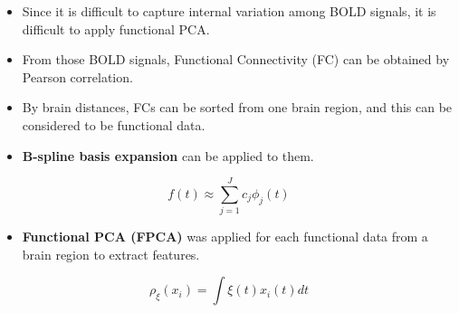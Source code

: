 
    
        \begin{itemize}
            \item Since it is difficult to capture internal variation among BOLD signals, it is difficult to apply functional PCA.

            \item From those BOLD signals, Functional Connectivity (FC) can be obtained by Pearson correlation.
        
            \item By brain distances, FCs can be sorted from one brain region, and this can be considered to be functional data.

            \item \textbf{B-spline basis expansion} can be applied to them.
            
        \end{itemize}
    
            \begin{equation*}
                f(t) \approx \sum_{j=1}^{J} c_j \phi_j(t)
            \end{equation*}

            \begin{itemize}
                \item \textbf{Functional PCA (FPCA)} was applied for each functional data from a brain region to extract features.
            \end{itemize}


     \begin{equation*}
         {{\rho }_{\xi }}\left( {{x}_{i}} \right)=\int{\xi \left( t \right){{x}_{i}}\left( t \right)dt}
     \end{equation*}


